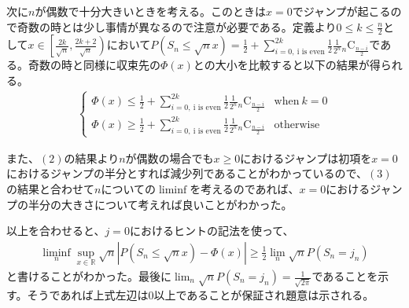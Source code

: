 \documentclass{article}
\begin{document}
次に$n$が偶数で十分大きいときを考える。このときは$x=0$でジャンプが起こるので奇数の時とは少し事情が異なるので注意が必要である。定義より$0\leq k\leq \frac{n}{2}$として$x\in \left[ \frac{2k}{\sqrt{n}}, \frac{2k+2}{\sqrt{n}} \right)$において$P\left( S_n \leq \sqrt{n} x \right) = \frac{1}{2} + \sum_{i=0,\ \text{i is even}}^{2k} \frac{1}{2} \frac{1}{2^n} {}_n \mathrm{C} _\frac{n-i}{2}$である。奇数の時と同様に収束先の$\Phi(x)$との大小を比較すると以下の結果が得られる。
\begin{align}
	\begin{cases}
	\Phi(x) \leq \frac{1}{2} + \sum_{i=0,\ \text{i is even}}^{2k} \frac{1}{2} \frac{1}{2^n} {}_n \mathrm{C} _\frac{n-i}{2} & \text{when}\ k=0\\[8pt]
	\Phi(x) \geq \frac{1}{2} + \sum_{i=0,\ \text{i is even}}^{2k} \frac{1}{2} \frac{1}{2^n} {}_n \mathrm{C} _\frac{n-i}{2} & \text{otherwise}
	\end{cases}
\end{align}

また、$(2)$の結果より$n$が偶数の場合でも$x\geq0$におけるジャンプは初項を$x=0$におけるジャンプの半分とすれば減少列であることがわかっているので、$(3)$の結果と合わせて$n$についての$\liminf$を考えるのであれば、$x=0$におけるジャンプの半分の大きさについて考えれば良いことがわかった。

以上を合わせると、$j=0$におけるヒントの記法を使って、
\begin{align*}
	\liminf_n \sup_{x\in \mathbb{R}} \sqrt{n} \left| P\left( S_n \leq \sqrt{n} x \right) - \Phi(x) \right| \geq \frac{1}{2} \lim_n \sqrt{n} P\left( S_n = j_n \right)
\end{align*}
と書けることがわかった。最後に$\lim_n \sqrt{n} P\left( S_n = j_n \right) = \frac{1}{\sqrt{2\pi}}$であることを示す。そうであれば上式左辺は$0$以上であることが保証され題意は示される。
\end{document}
